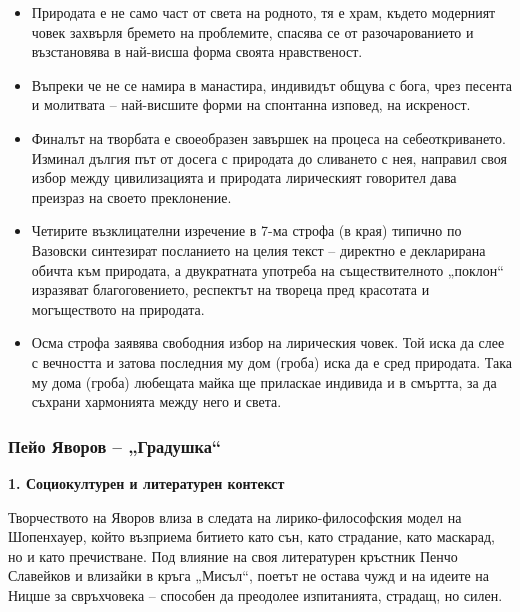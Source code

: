 \documentclass[12pt,a4paper]{article}
\begin{document}
\vspace{0.1cm}
\begin{itemize}[leftmargin=*, noitemsep, topsep=2pt, parsep=0pt]
    \item Природата е не само част от света на родното, тя е храм, където модерният човек захвърля бремето на проблемите, спасява се от разочарованието и възстановява в най-висша форма своята нравственост.
    \vspace{0.1cm}
    \item Въпреки че не се намира в манастира, индивидът общува с бога, чрез песента и молитвата – най-висшите форми на спонтанна изповед, на искреност.
    \vspace{0.1cm}
    \item Финалът на творбата е своеобразен завършек на процеса на себеоткриването. Изминал дългия път от досега с природата до сливането с нея, направил своя избор между цивилизацията и природата лирическият говорител дава преизраз на своето преклонение.
    \vspace{0.1cm}
    \item Четирите възклицателни изречение в 7-ма строфа (в края) типично по Вазовски синтезират посланието на целия текст – директно е декларирана обичта към природата, а двукратната употреба на съществителното „поклон“ изразяват благоговението, респектът на твореца пред красотата и могъществото на природата.
    \vspace{0.1cm}
    \item Осма строфа заявява свободния избор на лирическия човек. Той иска да слее с вечността и затова последния му дом (гроба) иска да е сред природата. Така му дома (гроба) любещата майка ще приласкае индивида и в смъртта, за да съхрани хармонията между него и света.
\end{itemize}

\newpage

\subsubsection{\colorbox{green!40}{Пейо Яворов – „Градушка“}}
\textbf{1. Социокултурен и литературен контекст}
\vspace{0.1cm}

\indent Творчеството на Яворов влиза в следата на лирико-философския модел на Шопенхауер, който възприема битието като сън, като страдание, като маскарад, но и като пречистване. Под влияние на своя литературен кръстник Пенчо Славейков и влизайки в кръга „Мисъл“, поетът не остава чужд и на идеите на Ницше за свръхчовека – способен да преодолее изпитанията, страдащ, но силен.
\end{document}
